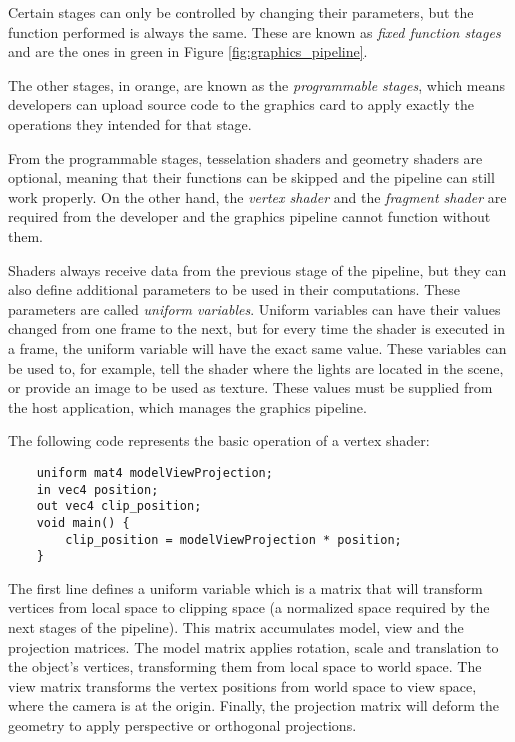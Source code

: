 Certain stages can only be controlled by changing their parameters, but the function performed is always the same. These are known as \textit{fixed function stages} and are the ones in green in Figure \ref{fig:graphics_pipeline}.

The other stages, in orange, are known as the \textit{programmable stages}, which means developers can upload source code to the graphics card to apply exactly the operations they intended for that stage.

From the programmable stages, tesselation shaders and geometry shaders are optional, meaning that their functions can be skipped and the pipeline can still work properly. On the other hand, the \textit{vertex shader} and the \textit{fragment shader} are required from the developer and the graphics pipeline cannot function without them.

Shaders always receive data from the previous stage of the pipeline, but they can also define additional parameters to be used in their computations. These parameters are called \textit{uniform variables}. Uniform variables can have their values changed from one frame to the next, but for every time the shader is executed in a frame, the uniform variable will have the exact same value. These variables can be used to, for example, tell the shader where the lights are located in the scene, or provide an image to be used as texture. These values must be supplied from the host application, which manages the graphics pipeline.

The following code represents the basic operation of a vertex shader:

\begin{verbatim}
    uniform mat4 modelViewProjection;
    in vec4 position;
    out vec4 clip_position;
    void main() {
        clip_position = modelViewProjection * position;
    }
\end{verbatim}

The first line defines a uniform variable which is a matrix that will transform vertices from local space to clipping space (a normalized space required by the next stages of the pipeline). This matrix accumulates model, view and the projection matrices. The model matrix applies rotation, scale and translation to the object's vertices, transforming them from local space to world space. The view matrix transforms the vertex positions from world space to view space, where the camera is at the origin. Finally, the projection matrix will deform the geometry to apply perspective or orthogonal projections.

